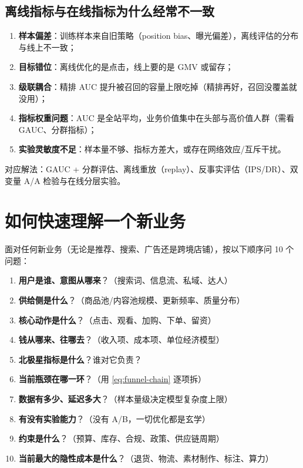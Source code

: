\subsection{离线指标与在线指标为什么经常不一致}

\begin{pitfall}
\begin{enumerate}
  \item \textbf{样本偏差}：训练样本来自旧策略（position bias、曝光偏差），离线评估的分布与线上不一致；
  \item \textbf{目标错位}：离线优化的是点击，线上要的是 GMV 或留存；
  \item \textbf{级联耦合}：精排 AUC 提升被召回的容量上限吃掉（精排再好，召回没覆盖就没用）；
  \item \textbf{指标权重问题}：AUC 是全站平均，业务价值集中在头部与高价值人群（需看 GAUC、分群指标）；
  \item \textbf{实验灵敏度不足}：样本量不够、指标方差大，或存在网络效应/互斥干扰。
\end{enumerate}
对应解法：GAUC + 分群评估、离线重放（replay）、反事实评估（IPS/DR）、双变量 A/A 检验与在线分层实验。
\end{pitfall}

\section{如何快速理解一个新业务}

\begin{toolbox}[30 分钟业务拆解清单]
面对任何新业务（无论是推荐、搜索、广告还是跨境店铺），按以下顺序问 10 个问题：
\begin{enumerate}
  \item \textbf{用户是谁、意图从哪来}？（搜索词、信息流、私域、达人）
  \item \textbf{供给侧是什么}？（商品池/内容池规模、更新频率、质量分布）
  \item \textbf{核心动作是什么}？（点击、观看、加购、下单、留资）
  \item \textbf{钱从哪来、往哪去}？（收入项、成本项、单位经济模型）
  \item \textbf{北极星指标是什么}？谁对它负责？
  \item \textbf{当前瓶颈在哪一环}？（用 \cref{eq:funnel-chain} 逐项拆）
  \item \textbf{数据有多少、延迟多大}？（样本量级决定模型复杂度上限）
  \item \textbf{有没有实验能力}？（没有 A/B，一切优化都是玄学）
  \item \textbf{约束是什么}？（预算、库存、合规、政策、供应链周期）
  \item \textbf{当前最大的隐性成本是什么}？（退货、物流、素材制作、标注、算力）
\end{enumerate}
\end{toolbox}

